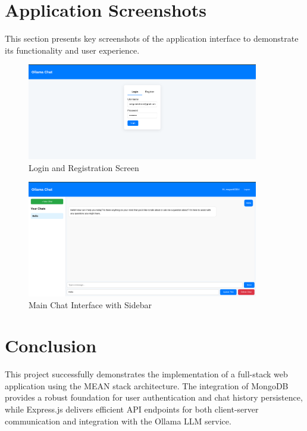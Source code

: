 \documentclass[12pt,a4paper]{article}
\begin{document}
\section{Application Screenshots}
This section presents key screenshots of the application interface to demonstrate its functionality and user experience.

\begin{figure}[H]
    \centering
    \includegraphics[width=0.9\textwidth]{assets/login_screen.png}
    \caption{Login and Registration Screen}
    \label{fig:login}
\end{figure}

\begin{figure}[H]
    \centering
    \includegraphics[width=0.9\textwidth]{assets/chat_interface.png}
    \caption{Main Chat Interface with Sidebar}
    \label{fig:chat}
\end{figure}

\section{Conclusion}
This project successfully demonstrates the implementation of a full-stack web application using the MEAN stack architecture. The integration of MongoDB provides a robust foundation for user authentication and chat history persistence, while Express.js delivers efficient API endpoints for both client-server communication and integration with the Ollama LLM service.
\end{document}
